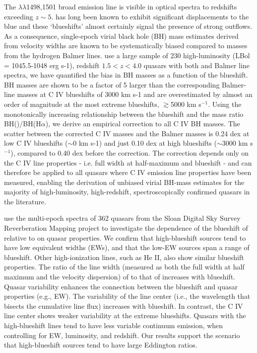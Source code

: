 \documentclass[a4paper,fleqn,usenatbib]{mnras}
\begin{document}
The \civ $\lambda \lambda$1498,1501 broad emission line is visible in optical spectra to redshifts exceeding $z\sim5$. \civ has long been known to exhibit significant displacements to the blue and these `blueshifts' almost certainly signal the presence of strong outflows. As a consequence, single-epoch virial black hole (BH) mass estimates derived from \civ velocity widths are known to be systematically biased compared to masses from the hydrogen Balmer lines. 
\citet{Coatman2017} use a large sample of 230 high-luminosity (LBol = 1045.5-1048 erg s-1), redshift $1.5 < z < 4.0$ quasars with both \civ and Balmer line spectra, we have quantified the bias in \civ BH masses as a function of the \civ blueshift. \civ BH masses are shown to be a factor of 5 larger than the corresponding Balmer-line masses at C IV blueshifts of 3000 km s-1 and are overestimated by almost an order of magnitude at the most extreme blueshifts, $\gtrsim$5000 km s$^{-1}$. Using the monotonically increasing relationship between the \civ blueshift and the mass ratio BH(\civ)/BH(H$\alpha$), we derive an empirical correction to all C IV BH masses. The scatter between the corrected C IV masses and the Balmer masses is 0.24 dex at low C IV blueshifts ($\sim$0 km s-1) and just 0.10 dex at high blueshifts ($\sim$3000 km s$^{-1}$), compared to 0.40 dex before the correction. The correction depends only on the C IV line properties - i.e. full width at half-maximum and blueshift - and can therefore be applied to all quasars where C IV emission line properties have been measured, enabling the derivation of unbiased virial BH-mass estimates for the majority of high-luminosity, high-redshift, spectroscopically confirmed quasars in the literature.

\citet{Sun2018} use the multi-epoch spectra of 362 quasars from the Sloan Digital Sky Survey Reverberation Mapping project to investigate the dependence of the blueshift of \civ relative to \mgii on quasar properties. We confirm that high-blueshift sources tend to have low \civ equivalent widths (EWs), and that the low-EW sources span a range of blueshift. Other high-ionization lines, such as He II, also show similar blueshift properties. The ratio of the line width (measured as both the full width at half maximum and the velocity dispersion) of \civ to that of \mgii increases with blueshift. Quasar variability enhances the connection between the \civ blueshift and quasar properties (e.g., EW). The variability of the \mgii line center (i.e., the wavelength that bisects the cumulative line flux) increases with blueshift. In contrast, the C IV line center shows weaker variability at the extreme blueshifts. Quasars with the high-blueshift \civ lines tend to have less variable continuum emission, when controlling for EW, luminosity, and redshift. Our results support the scenario that high-blueshift sources tend to have large Eddington ratios.
\end{document}
